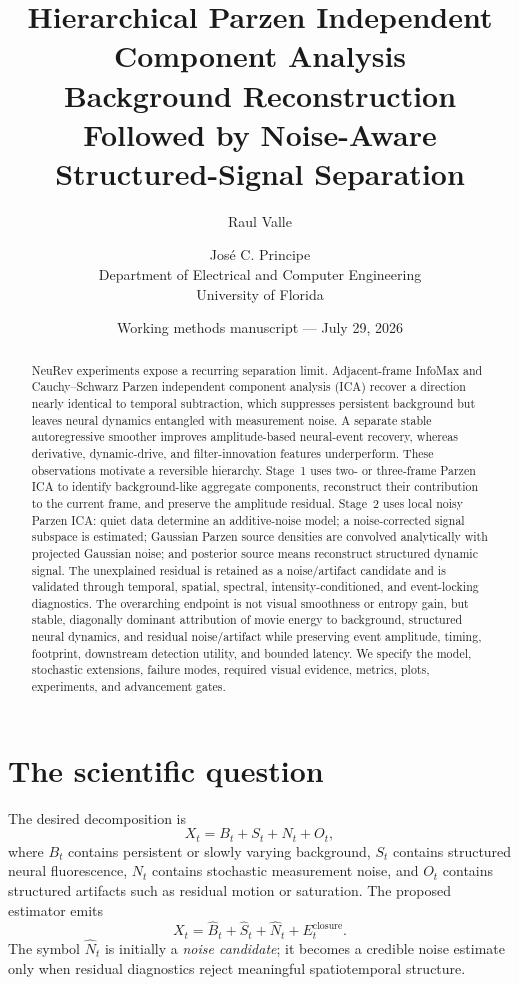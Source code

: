 \documentclass[11pt]{article}
\title{\textbf{Hierarchical Parzen Independent Component Analysis}\\
Background Reconstruction Followed by Noise-Aware Structured-Signal Separation}
\author{
Raul Valle \and Jos\'e C. Principe\\
Department of Electrical and Computer Engineering\\
University of Florida
}
\date{Working methods manuscript --- July 29, 2026}
\newcommand{\Bhat}{\widehat B}
\newcommand{\Shat}{\widehat S}
\newcommand{\Nhat}{\widehat N}
\begin{document}
\maketitle

\begin{abstract}
NeuRev experiments expose a recurring separation limit. Adjacent-frame InfoMax
and Cauchy--Schwarz Parzen independent component analysis (ICA) recover a
direction nearly identical to temporal subtraction, which suppresses persistent
background but leaves neural dynamics entangled with measurement noise. A
separate stable autoregressive smoother improves amplitude-based neural-event
recovery, whereas derivative, dynamic-drive, and filter-innovation features
underperform. These observations motivate a reversible hierarchy. Stage~1 uses
two- or three-frame Parzen ICA to identify background-like aggregate components,
reconstruct their contribution to the current frame, and preserve the
amplitude residual. Stage~2 uses local noisy Parzen ICA: quiet data determine an
additive-noise model; a noise-corrected signal subspace is estimated; Gaussian
Parzen source densities are convolved analytically with projected Gaussian
noise; and posterior source means reconstruct structured dynamic signal. The
unexplained residual is retained as a noise/artifact candidate and is validated
through temporal, spatial, spectral, intensity-conditioned, and event-locking
diagnostics. The overarching endpoint is not visual smoothness or entropy gain,
but stable, diagonally dominant attribution of movie energy to background,
structured neural dynamics, and residual noise/artifact while preserving event
amplitude, timing, footprint, downstream detection utility, and bounded
latency. We specify the model, stochastic extensions, failure modes, required
visual evidence, metrics, plots, experiments, and advancement gates.
\end{abstract}

\section{The scientific question}

The desired decomposition is
\begin{equation}
X_t = B_t + S_t + N_t + O_t,
\label{eq:true-decomp}
\end{equation}
where \(B_t\) contains persistent or slowly varying background, \(S_t\) contains
structured neural fluorescence, \(N_t\) contains stochastic measurement noise,
and \(O_t\) contains structured artifacts such as residual motion or saturation.
The proposed estimator emits
\begin{equation}
X_t = \Bhat_t + \Shat_t + \Nhat_t + E^{\mathrm{closure}}_t.
\label{eq:estimated-decomp}
\end{equation}
The symbol \(\Nhat_t\) is initially a \emph{noise candidate}; it becomes a
credible noise estimate only when residual diagnostics reject meaningful
spatiotemporal structure.
\end{document}
